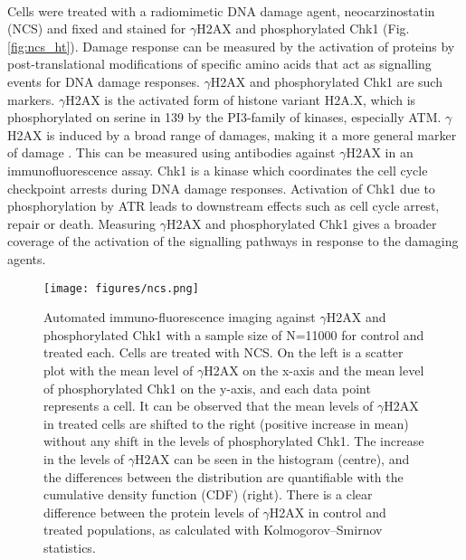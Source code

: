 \paragraph*{} Cells were treated with a radiomimetic DNA damage agent, neocarzinostatin (NCS) and fixed and stained for $\gamma$H2AX and phosphorylated Chk1 (Fig. \ref{fig:ncs_ht}). Damage response can be measured by the activation of proteins by post-translational modifications of specific amino acids that act as signalling events for DNA damage responses. $\gamma$H2AX and phosphorylated Chk1 are such markers. $\gamma$H2AX is the activated form of histone variant H2A.X, which is phosphorylated on serine in 139 by the PI3-family of kinases, especially ATM. $\gamma$H2AX is induced by a broad range of damages, making it a more general marker of damage \cite{kuo2008gamma}. This can be measured using antibodies against $\gamma$H2AX in an immunofluorescence assay. Chk1 is a kinase which coordinates the cell cycle checkpoint arrests during DNA damage responses. Activation of Chk1 due to phosphorylation by ATR leads to downstream effects such as cell cycle arrest, repair or death. Measuring $\gamma$H2AX and phosphorylated Chk1 gives a broader coverage of the activation of the signalling pathways in response to the damaging agents.

\begin{figure}[h]
    {\hfill\texttt{[image: figures/ncs.png]}\hspace*{\fill}}
    \caption{Automated immuno-fluorescence imaging against $\gamma$H2AX and phosphorylated Chk1 with a sample size of N=11000 for control and treated each. Cells are treated with NCS. On the left is a scatter plot with the mean level of $\gamma$H2AX on the x-axis and the mean level of phosphorylated Chk1 on the y-axis, and each data point represents a cell. It can be observed that the mean levels of $\gamma$H2AX in treated cells are shifted to the right (positive increase in mean) without any shift in the levels of phosphorylated Chk1. The increase in the levels of $\gamma$H2AX can be seen in the histogram (centre), and the differences between the distribution are quantifiable with the cumulative density function (CDF) (right). There is a clear difference between the protein levels of $\gamma$H2AX in control and treated populations, as calculated with Kolmogorov–Smirnov statistics.
    {\label{fig:ncs}}}
\end{figure}


